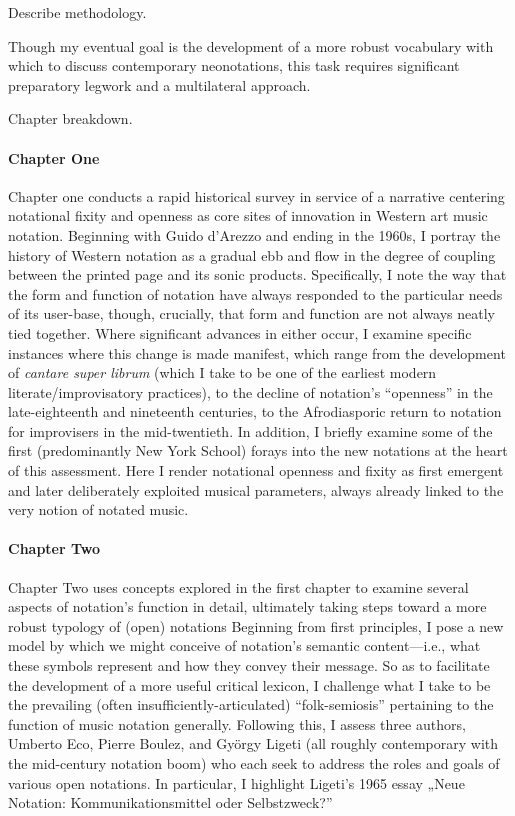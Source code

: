 \begin{notestuff}
    Describe methodology.
\end{notestuff}
Though my eventual goal is the development of a more robust vocabulary with which to discuss contemporary neonotations, this task requires significant preparatory legwork and a multilateral approach.

\begin{notestuff}
    Chapter breakdown.
\end{notestuff}
\paragraph{Chapter One} %
Chapter one conducts a rapid historical survey in service of a narrative centering notational fixity and openness as core sites of innovation in Western art music notation. 
Beginning with Guido d'Arezzo and ending in the 1960s, I portray the history of Western notation as a gradual ebb and flow in the degree of coupling between the printed page and its sonic products. 
Specifically, I note the way that the form and function of notation have always responded to the particular needs of its user-base, though, crucially, that form and function are not always neatly tied together.
Where significant advances in either occur, I examine specific instances where this change is made manifest, which range from the development of \textit{cantare super librum} (which I take to be one of the earliest modern literate/improvisatory practices), to the decline of notation's ``openness'' in the late-eighteenth and nineteenth centuries, to the Afrodiasporic return to notation for improvisers in the mid-twentieth.
In addition, I briefly examine some of the first (predominantly New York School) forays into the new notations at the heart of this assessment. 
Here I render notational openness and fixity as first emergent and later deliberately exploited musical parameters, always already linked to the very notion of notated music.

\paragraph{Chapter Two}
Chapter Two uses concepts explored in the first chapter to examine several aspects of notation's function in detail, ultimately taking steps toward a more robust typology of (open) notations
Beginning from first principles, I pose a new model by which we might conceive of notation's semantic content---i.e., what these symbols represent and how they convey their message.
So as to facilitate the development of a more useful critical lexicon, I challenge what I take to be the prevailing (often insufficiently-articulated) ``folk-semiosis'' pertaining to the function of music notation generally.
Following this, I assess three authors, Umberto Eco, Pierre Boulez, and Gy\"{o}rgy Ligeti (all roughly contemporary with the mid-century notation boom) who each seek to address the roles and goals of various open notations. 
In particular, I highlight Ligeti's 1965 essay „Neue Notation: Kommunikationsmittel oder Selbstzweck?” 


